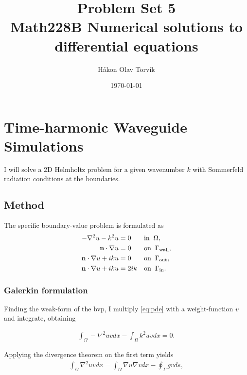 \documentclass[aps, 12pt]{revtex4}
\begin{document}
\author{Håkon Olav Torvik}
\title{\Huge Problem Set 5 \\ \small Math228B Numerical solutions to differential equations}
\date{\today}


\maketitle

\section*{Time-harmonic Waveguide Simulations}

I will solve a 2D Helmholtz problem for a given wavenumber $k$ with Sommerfeld radiation conditions at the boundaries.

\subsection{Method}


The specific boundary-value problem is formulated as
\begin{align}
    -\nabla^2u-k^2u               & = 0   &  & \text{in}\hspace{2mm} \Omega, \label{eq:pde}
    \\
    \mathbf{n}\cdot\nabla u       & = 0   &  & \text{on}\hspace{2mm} \Gamma_{\text{wall}},\label{eq:bwall}
    \\
    \mathbf{n}\cdot\nabla u + iku & = 0   &  & \text{on}\hspace{2mm} \Gamma_{\text{out}}, \label{eq:bout}
    \\
    \mathbf{n}\cdot\nabla u + iku & = 2ik &  & \text{on}\hspace{2mm} \Gamma_{\text{in}}. \label{eq:bin}
\end{align}

\subsubsection{Galerkin formulation}
Finding the weak-form of the bvp, I multiply \eqref{eq:pde} with a weight-function $v$ and integrate, obtaining

\begin{align}\label{eq:weak}
    \int_{\Omega} -\nabla^2u vdx - \int_{\Omega}k^2uvdx = 0.
\end{align}

Applying the divergence theorem on the first term yields
\begin{align*}
    \int_{\Omega}\nabla^2uvdx = \int_{\Omega}\nabla u\nabla vdx - \oint_{\Gamma}gvds,
\end{align*}
\end{document}
